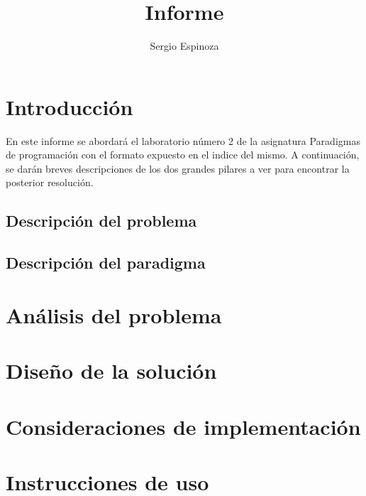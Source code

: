 \documentclass[10pt,letterpaper,openany]{article}
\title{Informe}
\author{Sergio Espinoza}
\begin{document}
    
    
    \tableofcontents
    \listoftables
    \newpage


    
    \section{Introducción}
    En este informe se abordará el laboratorio número 2 de la asignatura Paradigmas de programación
    con el formato expuesto en el indice del mismo. A continuación, se darán breves descripciones
    de los dos grandes pilares a ver para encontrar la posterior resolución.  
        \subsection{Descripción del problema}
            
        \subsection{Descripción del paradigma}
            


    \section{Análisis del problema}
        

    \section{Diseño de la solución}\label{sec:diseño}
        

    \section{Consideraciones de implementación}
        

    \section{Instrucciones de uso}
        
\end{document}

